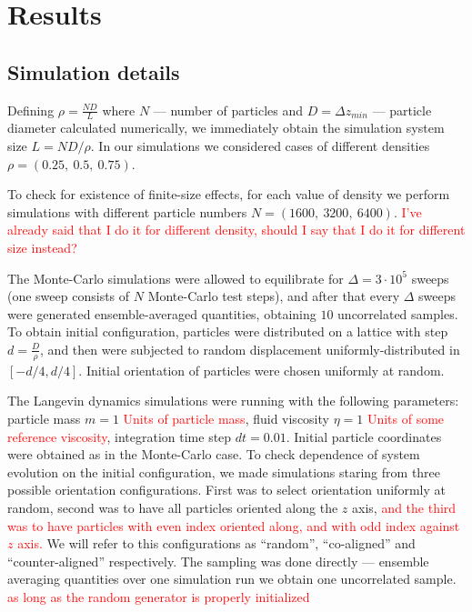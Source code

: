 \section{Results}
\subsection{Simulation details}
\label{subsec:simulation_details}

Defining $\rho = \frac{N D}{L}$ where $N$ --- number of particles and $D = \Delta z_{min}$ --- particle diameter calculated numerically, we immediately obtain the simulation system size $L = N D/ \rho$. In our simulations we considered cases of different densities $\rho = (0.25,\ 0.5,\ 0.75)$.

To check for existence of finite-size effects, for each value of density we perform simulations with different particle numbers $N = (1600,\ 3200,\ 6400)$. \textcolor{red}{I've already said that I do it for different density, should I say that I do it for different size instead?}

The Monte-Carlo simulations were allowed to equilibrate for $\Delta = 3 \cdot 10^5$ sweeps (one sweep consists of $N$ Monte-Carlo test steps), and after that every $\Delta$ sweeps were generated ensemble-averaged quantities, obtaining $10$ uncorrelated samples. To obtain initial configuration, particles were distributed on a lattice with step $d = \frac{D}{\rho}$, and then were subjected to random displacement uniformly-distributed in $[-d/4, d/4]$. Initial orientation of particles were chosen uniformly at random.

The Langevin dynamics simulations were running with the following parameters: particle mass $m = 1$ \textcolor{red}{Units of particle mass}, fluid viscosity $\eta = 1$ \textcolor{red}{Units of some reference viscosity}, integration time step $d t = 0.01$. Initial particle coordinates were obtained as in the Monte-Carlo case. To check dependence of system evolution on the initial configuration, we made simulations staring from three possible orientation configurations. First was to select orientation uniformly at random, second was to have all particles oriented along the $z$ axis, \textcolor{red}{and the third was to have particles with even index oriented along, and with odd index against $z$ axis.} We will refer to this configurations as ``random'', ``co-aligned'' and ``counter-aligned'' respectively. The sampling was done directly --- ensemble averaging quantities over one simulation run we obtain one uncorrelated sample. \textcolor{red}{as long as the random generator is properly initialized}

